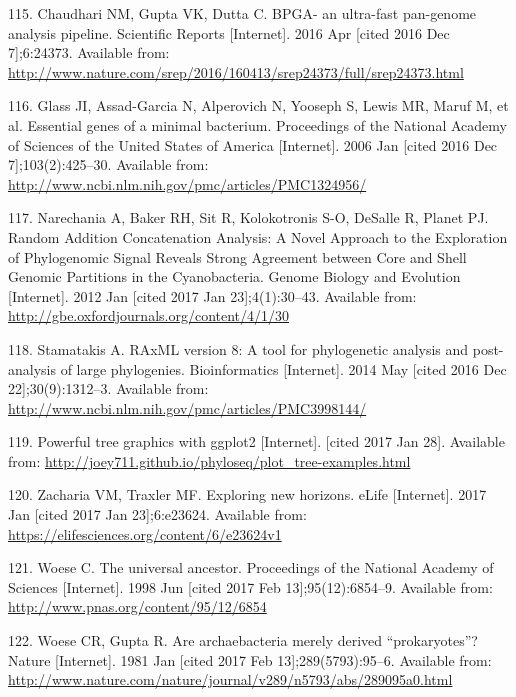 \documentclass[12pt,twoside]{reedthesis}
\begin{document}
  \hypertarget{ref-chaudhari_bpga-_2016}{}
  115. Chaudhari NM, Gupta VK, Dutta C. BPGA- an ultra-fast pan-genome
  analysis pipeline. Scientific Reports {[}Internet{]}. 2016 Apr {[}cited
  2016 Dec 7{]};6:24373. Available from:
  \url{http://www.nature.com/srep/2016/160413/srep24373/full/srep24373.html}
  
  \hypertarget{ref-glass_essential_2006}{}
  116. Glass JI, Assad-Garcia N, Alperovich N, Yooseph S, Lewis MR, Maruf
  M, et al. Essential genes of a minimal bacterium. Proceedings of the
  National Academy of Sciences of the United States of America
  {[}Internet{]}. 2006 Jan {[}cited 2016 Dec 7{]};103(2):425--30.
  Available from:
  \url{http://www.ncbi.nlm.nih.gov/pmc/articles/PMC1324956/}
  
  \hypertarget{ref-narechania_random_2012}{}
  117. Narechania A, Baker RH, Sit R, Kolokotronis S-O, DeSalle R, Planet
  PJ. Random Addition Concatenation Analysis: A Novel Approach to the
  Exploration of Phylogenomic Signal Reveals Strong Agreement between Core
  and Shell Genomic Partitions in the Cyanobacteria. Genome Biology and
  Evolution {[}Internet{]}. 2012 Jan {[}cited 2017 Jan 23{]};4(1):30--43.
  Available from: \url{http://gbe.oxfordjournals.org/content/4/1/30}
  
  \hypertarget{ref-stamatakis_raxml_2014}{}
  118. Stamatakis A. RAxML version 8: A tool for phylogenetic analysis and
  post-analysis of large phylogenies. Bioinformatics {[}Internet{]}. 2014
  May {[}cited 2016 Dec 22{]};30(9):1312--3. Available from:
  \url{http://www.ncbi.nlm.nih.gov/pmc/articles/PMC3998144/}
  
  \hypertarget{ref-phyloseq_powerful_2016}{}
  119. Powerful tree graphics with ggplot2 {[}Internet{]}. {[}cited 2017
  Jan 28{]}. Available from:
  \url{http://joey711.github.io/phyloseq/plot_tree-examples.html}
  
  \hypertarget{ref-zacharia_exploring_2017}{}
  120. Zacharia VM, Traxler MF. Exploring new horizons. eLife
  {[}Internet{]}. 2017 Jan {[}cited 2017 Jan 23{]};6:e23624. Available
  from: \url{https://elifesciences.org/content/6/e23624v1}
  
  \hypertarget{ref-woese_universal_1998}{}
  121. Woese C. The universal ancestor. Proceedings of the National
  Academy of Sciences {[}Internet{]}. 1998 Jun {[}cited 2017 Feb
  13{]};95(12):6854--9. Available from:
  \url{http://www.pnas.org/content/95/12/6854}
  
  \hypertarget{ref-woese_are_1981}{}
  122. Woese CR, Gupta R. Are archaebacteria merely derived
  ``prokaryotes''? Nature {[}Internet{]}. 1981 Jan {[}cited 2017 Feb
  13{]};289(5793):95--6. Available from:
  \url{http://www.nature.com/nature/journal/v289/n5793/abs/289095a0.html}
  
\end{document}

